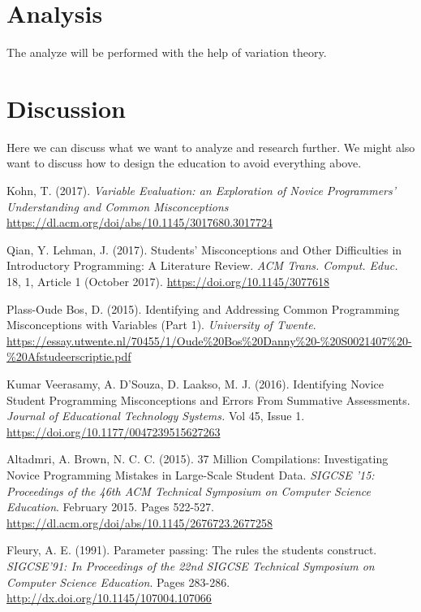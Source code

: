 \documentclass[twocolumn]{article}
\begin{document}
\section{Analysis}

The analyze will be performed with the help of variation theory. 

\section{Discussion}

Here we can discuss what we want to analyze and research further. We might also want to discuss how to design the education to avoid everything above.

\newpage

\begin{thebibliography}{9}

Kohn, T.  (2017). \emph{Variable Evaluation: an Exploration of Novice Programmers’ Understanding and Common Misconceptions}
\url{https://dl.acm.org/doi/abs/10.1145/3017680.3017724}

Qian, Y. Lehman, J. (2017). Students’ Misconceptions and Other Difficulties in Introductory Programming: A Literature Review. \emph{ACM Trans. Comput. Educ.} 18, 1, Article 1 (October 2017).
\url{https://doi.org/10.1145/3077618}

Plass-Oude Bos, D.  (2015). Identifying and Addressing Common Programming Misconceptions with Variables (Part 1). \emph{University of Twente}.
\url{https://essay.utwente.nl/70455/1/Oude%20Bos%20Danny%20-%20S0021407%20-%20Afstudeerscriptie.pdf}

Kumar Veerasamy, A. D’Souza, D. Laakso, M. J. (2016). Identifying Novice Student Programming Misconceptions and Errors From Summative Assessments. \emph{Journal of Educational Technology Systems.} Vol 45, Issue 1.  
\url{https://doi.org/10.1177/0047239515627263}

Altadmri, A. Brown, N. C. C. (2015). 37 Million Compilations: Investigating Novice Programming Mistakes in Large-Scale Student Data. \emph{SIGCSE '15: Proceedings of the 46th ACM Technical Symposium on Computer Science Education}. February 2015. Pages 522-527.
\url{https://dl.acm.org/doi/abs/10.1145/2676723.2677258}

Fleury, A. E. (1991). Parameter passing: The rules the students construct. \emph{SIGCSE’91:  In Proceedings of the 22nd SIGCSE Technical Symposium on Computer Science Education}. Pages 283-286.
\url{http://dx.doi.org/10.1145/107004.107066}


\end{thebibliography}
\end{document}
